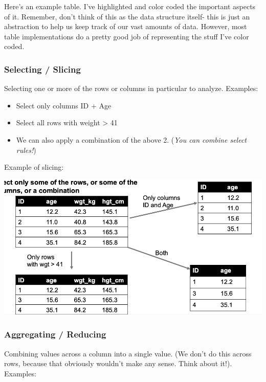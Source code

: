 \documentclass[english, 10pt]{article}
\begin{document}
\hfill \break Here's an example table. I've highlighted and color coded the important aspects of it. Remember, don't think of this as the data structure itself- this is just an abstraction to help us keep track of our vast amounts of data. However, most table implementations do a pretty good job of representing the stuff I've color coded.\\

\subsubsection{Selecting / Slicing}

Selecting one or more of the rows or columns in particular to analyze. Examples:

\begin{itemize}
	\item Select only columns ID + Age
	\item Select all rows with weight > 41
	\item We can also apply a combination of the above 2. (\textit{You can combine select rules!})
\end{itemize}
Example of slicing:
\begin{center}
	\includegraphics[scale=0.4]{img/Slicing.png}
\end{center}
\subsubsection{Aggregating / Reducing}

Combining values across a column into a single value. (We don't do this across rows, because that obviously wouldn't make any sense. Think about it!). Examples:
\end{document}
